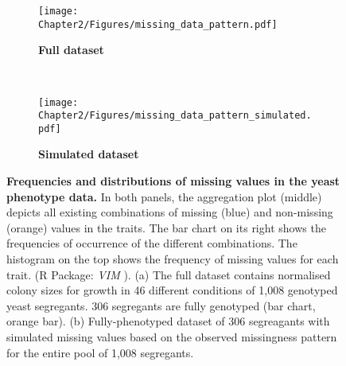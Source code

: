 \begin{figure}[p]
	\centering
	\begin{subfigure}[b]{1\textwidth}
		\center
	\texttt{[image: Chapter2/Figures/missing\_data\_pattern.pdf]}
	\caption{\textbf{Full dataset}}
 		\label{fig:missingness-all}
	\end{subfigure}
	\\
	\begin{subfigure}[b]{1\textwidth}
		\center
	\texttt{[image: Chapter2/Figures/missing\_data\_pattern\_simulated.pdf]}\\
	\caption{\textbf{Simulated  dataset}}
 		\label{fig:missingness-sample}
	\end{subfigure}
	\caption[Frequencies and distributions of missing values in the yeast phenotype data]{\textbf{Frequencies and distributions of missing values in the yeast phenotype data.} In both panels, the aggregation plot (middle) depicts all existing combinations of missing (blue) and non-missing (orange) values in the traits. The bar chart on its right shows the frequencies of occurrence of the different combinations. The histogram on the top shows the frequency of missing values for each trait. (R Package: \emph{VIM} \citep{Templ2012}). (a) The full dataset contains normalised colony sizes for growth in 46 different conditions of 1,008 genotyped yeast segregants. 306 segregants are fully genotyped (bar chart, orange bar). (b) Fully-phenotyped dataset of 306 segreagants with simulated missing values based on the observed missingness pattern for the entire pool of 1,008 segregants.}
 	\label{fig:missingness}
\end{figure}

